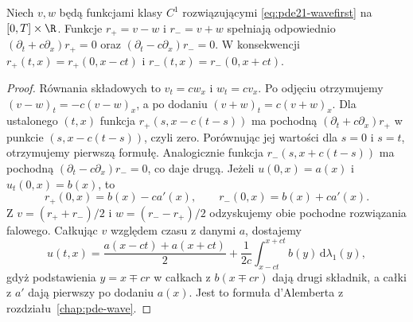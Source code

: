 \begin{stwierdzenie}
Niech $v,w$ będą funkcjami klasy $C^1$ rozwiązującymi
\eqref{eq:pde21-wavefirst} na $[0,T]\times\R$. Funkcje
$r_+=v-w$ i $r_-=v+w$ spełniają odpowiednio
$(\partial_t+c\partial_x)r_+=0$ oraz
$(\partial_t-c\partial_x)r_-=0$.
W konsekwencji $r_+(t,x)=r_+(0,x-ct)$ i
$r_-(t,x)=r_-(0,x+ct)$.
\end{stwierdzenie}
\begin{proof}
Równania składowych to $v_t=cw_x$ i $w_t=cv_x$.
Po odjęciu otrzymujemy $(v-w)_t=-c(v-w)_x$,
a po dodaniu $(v+w)_t=c(v+w)_x$.
Dla ustalonego $(t,x)$ funkcja
$r_+(s,x-c(t-s))$ ma pochodną
$(\partial_t+c\partial_x)r_+$ w punkcie
$(s,x-c(t-s))$, czyli zero. Porównując jej wartości
dla $s=0$ i $s=t$, otrzymujemy pierwszą formułę.
Analogicznie funkcja $r_-(s,x+c(t-s))$ ma pochodną
$(\partial_t-c\partial_x)r_-=0$, co daje drugą.
Jeżeli $u(0,x)=a(x)$ i $u_t(0,x)=b(x)$, to
\[
 r_+(0,x)=b(x)-ca'(x),\qquad
 r_-(0,x)=b(x)+ca'(x).
\]
Z $v=(r_++r_-)/2$ i $w=(r_--r_+)/2$
odzyskujemy obie pochodne rozwiązania falowego.
Całkując $v$ względem czasu z danymi $a$, dostajemy
\[
 u(t,x)=\frac{a(x-ct)+a(x+ct)}{2}
 +\frac1{2c}\int_{x-ct}^{x+ct}b(y)\,\mathrm d\lambda_1(y),
\]
gdyż podstawienia $y=x\mp cr$ w całkach z $b(x\mp cr)$
dają drugi składnik, a całki z $a'$ dają pierwszy
po dodaniu $a(x)$. Jest to formuła d'Alemberta
z rozdziału~\ref{chap:pde-wave}.
\end{proof}

